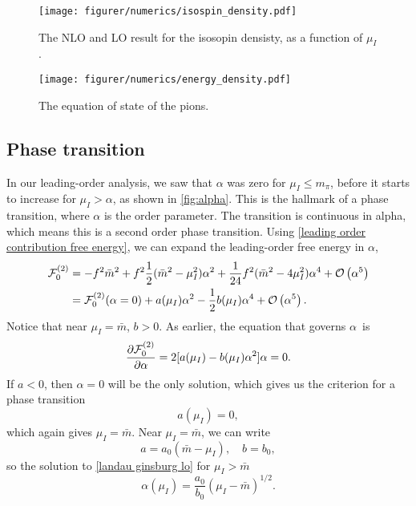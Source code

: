 \begin{figure}[!h]
    \centering
    \vspace{-0.2cm}
    \texttt{[image: figurer/numerics/isospin\_density.pdf]}
    \caption{The NLO and LO result for the isosopin densisty, as a function of $\mu_I$.}
    \label{fig:isospin_density}
\end{figure}

\begin{figure}[!h]
    \centering
    \vspace{-0.2cm}
    \texttt{[image: figurer/numerics/energy\_density.pdf]}
    \caption{The equation of state of the pions.}
    \label{fig:equation of state}
\end{figure}

\FloatBarrier

\subsection*{Phase transition}
In our leading-order analysis, we saw that $\alpha$ was zero for $\mu_I \leq m_\pi$, before it starts to increase for $\mu_I>\alpha$, as shown in \autoref{fig:alpha}.
This is the hallmark of a phase transition, where $\alpha$ is the order parameter.
The transition is continuous in alpha, which means this is a second order phase transition.
Using \cref{leading order contribution free energy}, we can expand the leading-order free energy in $\alpha$,
\begin{align}
    \Ef_0^{(2)} 
    & = -f^2 \bar m^2 + f^2 \frac{1}{2}(\bar m^2 - \mu_I^2)\alpha^2
    +\frac{1}{24} f^2 (\bar m^2 - 4 \mu_I^2) \alpha^4 + \Oh[5]{\alpha} \\
    & = \Ef_0^{(2)}(\alpha=0) + a(\mu_I)\alpha^2 - \frac{1}{2} b(\mu_I)\alpha^4 + \Oh[5]{\alpha}.
\end{align}
Notice that near $\mu_I = \bar m$, $b > 0$.
As earlier, the equation that governs $\alpha$ is
\begin{equation}
    \label{landau ginsburg lo}
    \diffp{\Ef_0^{(2)}}{\alpha} = 2 [a(\mu_I) - b(\mu_I) \alpha^2] \alpha = 0.
\end{equation}
If $a<0$, then $\alpha = 0$ will be the only solution, which gives us the criterion for a phase transition 
\begin{equation}
    a(\mu_I) = 0,
\end{equation}
which again gives $\mu_I = \bar m$.
Near $\mu_I = \bar m$, we can write
\begin{equation}
    a = a_0 (\bar m - \mu_I), \quad b = b_0,
\end{equation}
so the solution to \cref{landau ginsburg lo} for $\mu_I>\bar m$
\begin{equation}
    \alpha(\mu_I) = \frac{a_0}{b_0} (\mu_I - \bar m)^{1/2}.
\end{equation}
